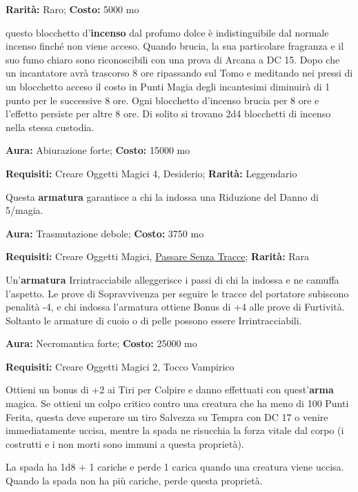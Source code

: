 \begin{multicols}{2}
\textbf{Rarità:} Raro; \textbf{Costo:} 5000 mo

questo blocchetto d'\textbf{incenso} dal profumo dolce è indistinguibile dal normale incenso finché non viene acceso. Quando brucia, la sua particolare fragranza e il suo fumo chiaro sono riconoscibili con una prova di Arcana a DC 15. Dopo che un incantatore avrà trascorso 8 ore ripassando sul Tomo e meditando nei pressi di un blocchetto acceso il costo in Punti Magia degli incantesimi diminuirà di 1 punto per le successive 8 ore. Ogni blocchetto d'incenso brucia per 8 ore e l'effetto persiste per altre 8 ore. Di solito si trovano 2d4 blocchetti di incenso nella stessa custodia.


\textbf{Aura:} Abiurazione forte; \textbf{Costo:} 15000 mo

\textbf{Requisiti:} Creare Oggetti Magici 4, Desiderio; \textbf{Rarità:} Leggendario

Questa \textbf{armatura} garantisce a chi la indossa una Riduzione del Danno di 5/magia.


\textbf{Aura:} Trasmutazione debole; \textbf{Costo:} 3750 mo

\textbf{Requisiti:} Creare Oggetti Magici, \hyperlink{Passare Senza Tracce}{Passare Senza Tracce}; \textbf{Rarità:} Rara

Un'\textbf{armatura} Irrintracciabile alleggerisce i passi di chi la indossa e ne camuffa l'aspetto. Le prove di Sopravvivenza per seguire le tracce del portatore subiscono penalità -4, e chi indossa l'armatura ottiene Bonus di +4 alle prove di Furtività. Soltanto le armature di cuoio o di pelle possono essere Irrintracciabili.


\textbf{Aura:} Necromantica forte; \textbf{Costo:} 25000 mo

\textbf{Requisiti:} Creare Oggetti Magici 2, Tocco Vampirico

Ottieni un bonus di +2 ai Tiri per Colpire e danno effettuati con quest'\textbf{arma} magica. Se ottieni un colpo critico contro una creatura che ha meno di 100 Punti Ferita, questa deve superare un tiro Salvezza su Tempra con DC 17 o venire immediatamente uccisa, mentre la spada ne risucchia la forza vitale dal corpo (i costrutti e i non morti sono immuni a questa proprietà).

La spada ha 1d8 + 1 cariche e perde 1 carica quando una creatura viene uccisa. Quando la spada non ha più cariche, perde questa proprietà.


\end{multicols}
